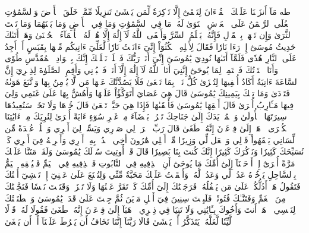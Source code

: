 طه
مَآ أَنزَلۡنَا عَلَيۡكَ ٱلۡقُرۡءَانَ لِتَشۡقَىٰٓ
إِلَّا تَذۡكِرَةٗ لِّمَن يَخۡشَىٰ
تَنزِيلٗا مِّمَّنۡ خَلَقَ ٱلۡأَرۡضَ وَٱلسَّمَٰوَٰتِ ٱلۡعُلَى
ٱلرَّحۡمَٰنُ عَلَى ٱلۡعَرۡشِ ٱسۡتَوَىٰ
لَهُۥ مَا فِي ٱلسَّمَٰوَٰتِ وَمَا فِي ٱلۡأَرۡضِ وَمَا بَيۡنَهُمَا وَمَا تَحۡتَ ٱلثَّرَىٰ
وَإِن تَجۡهَرۡ بِٱلۡقَوۡلِ فَإِنَّهُۥ يَعۡلَمُ ٱلسِّرَّ وَأَخۡفَى
ٱللَّهُ لَآ إِلَٰهَ إِلَّا هُوَۖ لَهُ ٱلۡأَسۡمَآءُ ٱلۡحُسۡنَىٰ
وَهَلۡ أَتَىٰكَ حَدِيثُ مُوسَىٰٓ
إِذۡ رَءَا نَارٗا فَقَالَ لِأَهۡلِهِ ٱمۡكُثُوٓاْ إِنِّيٓ ءَانَسۡتُ نَارٗا لَّعَلِّيٓ ءَاتِيكُم مِّنۡهَا بِقَبَسٍ أَوۡ أَجِدُ عَلَى ٱلنَّارِ هُدٗى
فَلَمَّآ أَتَىٰهَا نُودِيَ يَٰمُوسَىٰٓ
إِنِّيٓ أَنَا۠ رَبُّكَ فَٱخۡلَعۡ نَعۡلَيۡكَ إِنَّكَ بِٱلۡوَادِ ٱلۡمُقَدَّسِ طُوٗى
وَأَنَا ٱخۡتَرۡتُكَ فَٱسۡتَمِعۡ لِمَا يُوحَىٰٓ
إِنَّنِيٓ أَنَا ٱللَّهُ لَآ إِلَٰهَ إِلَّآ أَنَا۠ فَٱعۡبُدۡنِي وَأَقِمِ ٱلصَّلَوٰةَ لِذِكۡرِيٓ
إِنَّ ٱلسَّاعَةَ ءَاتِيَةٌ أَكَادُ أُخۡفِيهَا لِتُجۡزَىٰ كُلُّ نَفۡسِۭ بِمَا تَسۡعَىٰ
فَلَا يَصُدَّنَّكَ عَنۡهَا مَن لَّا يُؤۡمِنُ بِهَا وَٱتَّبَعَ هَوَىٰهُ فَتَرۡدَىٰ
وَمَا تِلۡكَ بِيَمِينِكَ يَٰمُوسَىٰ
قَالَ هِيَ عَصَايَ أَتَوَكَّؤُاْ عَلَيۡهَا وَأَهُشُّ بِهَا عَلَىٰ غَنَمِي وَلِيَ فِيهَا مَـَٔارِبُ أُخۡرَىٰ
قَالَ أَلۡقِهَا يَٰمُوسَىٰ
فَأَلۡقَىٰهَا فَإِذَا هِيَ حَيَّةٞ تَسۡعَىٰ
قَالَ خُذۡهَا وَلَا تَخَفۡۖ سَنُعِيدُهَا سِيرَتَهَا ٱلۡأُولَىٰ
وَٱضۡمُمۡ يَدَكَ إِلَىٰ جَنَاحِكَ تَخۡرُجۡ بَيۡضَآءَ مِنۡ غَيۡرِ سُوٓءٍ ءَايَةً أُخۡرَىٰ
لِنُرِيَكَ مِنۡ ءَايَٰتِنَا ٱلۡكُبۡرَى
ٱذۡهَبۡ إِلَىٰ فِرۡعَوۡنَ إِنَّهُۥ طَغَىٰ
قَالَ رَبِّ ٱشۡرَحۡ لِي صَدۡرِي
وَيَسِّرۡ لِيٓ أَمۡرِي
وَٱحۡلُلۡ عُقۡدَةٗ مِّن لِّسَانِي
يَفۡقَهُواْ قَوۡلِي
وَٱجۡعَل لِّي وَزِيرٗا مِّنۡ أَهۡلِي
هَٰرُونَ أَخِي
ٱشۡدُدۡ بِهِۦٓ أَزۡرِي
وَأَشۡرِكۡهُ فِيٓ أَمۡرِي
كَيۡ نُسَبِّحَكَ كَثِيرٗا
وَنَذۡكُرَكَ كَثِيرًا
إِنَّكَ كُنتَ بِنَا بَصِيرٗا
قَالَ قَدۡ أُوتِيتَ سُؤۡلَكَ يَٰمُوسَىٰ
وَلَقَدۡ مَنَنَّا عَلَيۡكَ مَرَّةً أُخۡرَىٰٓ
إِذۡ أَوۡحَيۡنَآ إِلَىٰٓ أُمِّكَ مَا يُوحَىٰٓ
أَنِ ٱقۡذِفِيهِ فِي ٱلتَّابُوتِ فَٱقۡذِفِيهِ فِي ٱلۡيَمِّ فَلۡيُلۡقِهِ ٱلۡيَمُّ بِٱلسَّاحِلِ يَأۡخُذۡهُ عَدُوّٞ لِّي وَعَدُوّٞ لَّهُۥۚ وَأَلۡقَيۡتُ عَلَيۡكَ مَحَبَّةٗ مِّنِّي وَلِتُصۡنَعَ عَلَىٰ عَيۡنِيٓ
إِذۡ تَمۡشِيٓ أُخۡتُكَ فَتَقُولُ هَلۡ أَدُلُّكُمۡ عَلَىٰ مَن يَكۡفُلُهُۥۖ فَرَجَعۡنَٰكَ إِلَىٰٓ أُمِّكَ كَيۡ تَقَرَّ عَيۡنُهَا وَلَا تَحۡزَنَۚ وَقَتَلۡتَ نَفۡسٗا فَنَجَّيۡنَٰكَ مِنَ ٱلۡغَمِّ وَفَتَنَّـٰكَ فُتُونٗاۚ فَلَبِثۡتَ سِنِينَ فِيٓ أَهۡلِ مَدۡيَنَ ثُمَّ جِئۡتَ عَلَىٰ قَدَرٖ يَٰمُوسَىٰ
وَٱصۡطَنَعۡتُكَ لِنَفۡسِي
ٱذۡهَبۡ أَنتَ وَأَخُوكَ بِـَٔايَٰتِي وَلَا تَنِيَا فِي ذِكۡرِي
ٱذۡهَبَآ إِلَىٰ فِرۡعَوۡنَ إِنَّهُۥ طَغَىٰ
فَقُولَا لَهُۥ قَوۡلٗا لَّيِّنٗا لَّعَلَّهُۥ يَتَذَكَّرُ أَوۡ يَخۡشَىٰ
قَالَا رَبَّنَآ إِنَّنَا نَخَافُ أَن يَفۡرُطَ عَلَيۡنَآ أَوۡ أَن يَطۡغَىٰ
